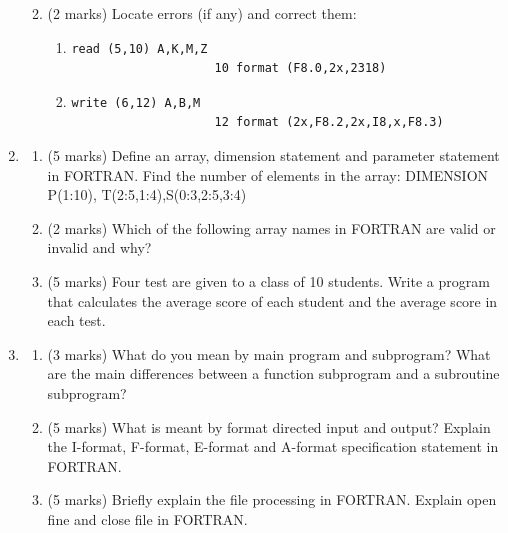 \documentclass[12pt,oneside]{book}
\begin{document}
\begin{enumerate}
\begin{enumerate}
\begin{enumerate}
            \end{enumerate}
            \item (2 marks) Locate errors (if any) and correct them:
            \begin{enumerate}
                \item \begin{lstlisting}[numbers=none]
                    read (5,10) A,K,M,Z
                    10 format (F8.0,2x,2318)
                \end{lstlisting}
                \item \begin{lstlisting}[numbers=none]
                    write (6,12) A,B,M
                    12 format (2x,F8.2,2x,I8,x,F8.3)
                \end{lstlisting}
            \end{enumerate}
        \end{enumerate}
        \item \begin{enumerate}
            \item (5 marks) Define an array, dimension statement and parameter statement in FORTRAN. Find the number of elements in the array: DIMENSION P(1:10), T(2:5,1:4),S(0:3,2:5,3:4)
            \item (2 marks) Which of the following array names in FORTRAN are valid or invalid and why?\\
            \item (5 marks) Four test are given to a class of 10 students. Write a program that calculates the average score of each student and the average score in each test.
        \end{enumerate}
        \item \begin{enumerate}
            \item (3 marks) What do you mean by main program and subprogram? What are the main differences between a function subprogram and a subroutine subprogram?
            \item (5 marks) What is meant by format directed input  and output? Explain the I-format, F-format, E-format and A-format specification statement in FORTRAN.
            \item (5 marks) Briefly explain the file processing in FORTRAN. Explain open fine and close file in FORTRAN.
        \end{enumerate}
    \end{enumerate}
\end{document}
